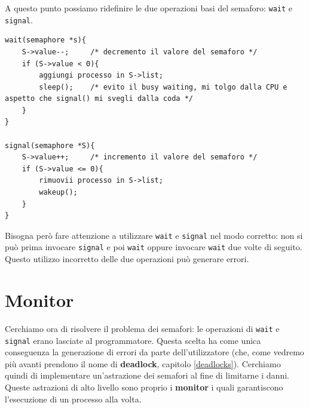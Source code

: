 A questo punto possiamo ridefinire le due operazioni basi del semaforo: \texttt{wait} e \texttt{signal}.
\begin{lstlisting}[caption={Utilizzo di semaforo con \textit{waiting queue}}]
wait(semaphore *s){
    S->value--;     /* decremento il valore del semaforo */
    if (S->value < 0){
        aggiungi processo in S->list;
        sleep();    /* evito il busy waiting, mi tolgo dalla CPU e aspetto che signal() mi svegli dalla coda */
    }
}

signal(semaphore *S){
    S->value++;     /* incremento il valore del semaforo */
    if (S->value <= 0){
        rimuovii processo in S->list;
        wakeup();
    }
}
\end{lstlisting}

Bisogna però fare attenzione a utilizzare \texttt{wait} e \texttt{signal} nel modo corretto: non si può prima invocare \texttt{signal} e poi \texttt{wait} oppure invocare \texttt{wait} due volte di seguito. Questo utilizzo incorretto delle due operazioni può generare errori.
% 
\section{Monitor}
Cerchiamo ora di risolvere il problema dei semafori: le operazioni di \texttt{wait} e \texttt{signal} erano lasciate al programmatore. Questa scelta ha come unica conseguenza la generazione di errori da parte dell'utilizzatore (che, come vedremo più avanti prendono il nome di \textbf{deadlock}, capitolo \ref{deadlocks}). Cerchiamo quindi di implementare un'astrazione dei semafori al fine di limitarne i danni. Queste astrazioni di alto livello sono proprio i \textbf{monitor} i quali garantiscono l'esecuzione di un processo alla volta.

